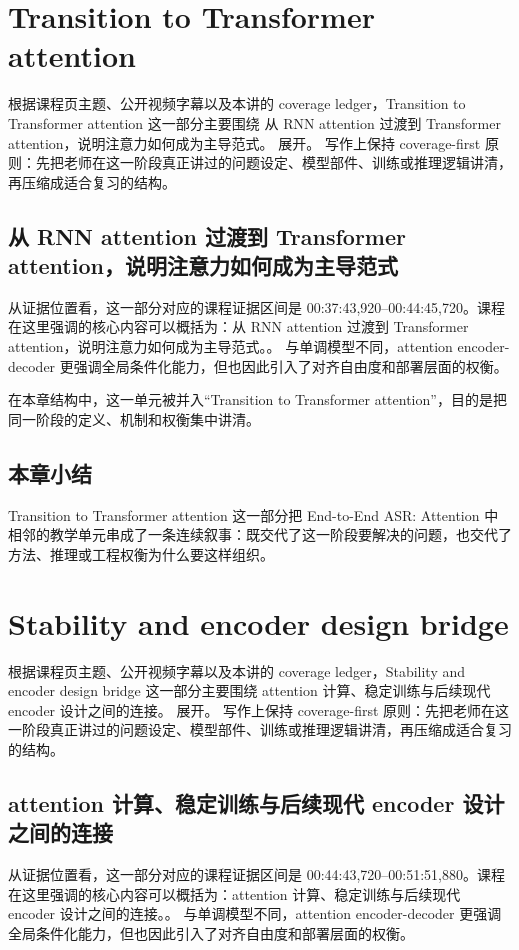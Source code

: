 \documentclass[a4paper]{article}
\begin{document}
\section{Transition to Transformer attention}
根据课程页主题、公开视频字幕以及本讲的 coverage ledger，Transition to Transformer attention 这一部分主要围绕 从 RNN attention 过渡到 Transformer attention，说明注意力如何成为主导范式。 展开。
写作上保持 coverage-first 原则：先把老师在这一阶段真正讲过的问题设定、模型部件、训练或推理逻辑讲清，再压缩成适合复习的结构。

\subsection{从 RNN attention 过渡到 Transformer attention，说明注意力如何成为主导范式}
从证据位置看，这一部分对应的课程证据区间是 00:37:43,920--00:44:45,720。课程在这里强调的核心内容可以概括为：从 RNN attention 过渡到 Transformer attention，说明注意力如何成为主导范式。。
与单调模型不同，attention encoder-decoder 更强调全局条件化能力，但也因此引入了对齐自由度和部署层面的权衡。

在本章结构中，这一单元被并入“Transition to Transformer attention”，目的是把同一阶段的定义、机制和权衡集中讲清。

\subsection{本章小结}
Transition to Transformer attention 这一部分把 End-to-End ASR: Attention 中相邻的教学单元串成了一条连续叙事：既交代了这一阶段要解决的问题，也交代了方法、推理或工程权衡为什么要这样组织。

\section{Stability and encoder design bridge}
根据课程页主题、公开视频字幕以及本讲的 coverage ledger，Stability and encoder design bridge 这一部分主要围绕 attention 计算、稳定训练与后续现代 encoder 设计之间的连接。 展开。
写作上保持 coverage-first 原则：先把老师在这一阶段真正讲过的问题设定、模型部件、训练或推理逻辑讲清，再压缩成适合复习的结构。

\subsection{attention 计算、稳定训练与后续现代 encoder 设计之间的连接}
从证据位置看，这一部分对应的课程证据区间是 00:44:43,720--00:51:51,880。课程在这里强调的核心内容可以概括为：attention 计算、稳定训练与后续现代 encoder 设计之间的连接。。
与单调模型不同，attention encoder-decoder 更强调全局条件化能力，但也因此引入了对齐自由度和部署层面的权衡。
\end{document}
